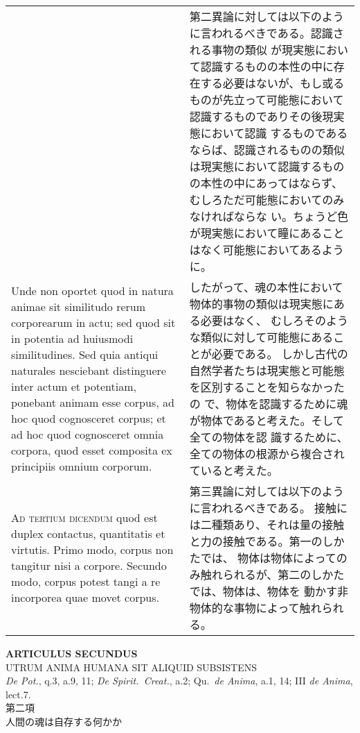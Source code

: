 \documentclass[paper=a4paper,fontsize=10pt,jafontsize=9pt,titlepage]{jlreq}
\begin{document}
\begin{longtable}{p{21em}p{21em}}
&

第二異論に対しては以下のように言われるべきである。認識される事物の類似
が現実態において認識するものの本性の中に存在する必要はないが、もし或る
ものが先立って可能態において認識するものでありその後現実態において認識
するものであるならば、認識されるものの類似は現実態において認識するもの
の本性の中にあってはならず、むしろただ可能態においてのみなければならな
い。ちょうど色が現実態において瞳にあることはなく可能態においてあるよう
に。

\\

Unde non oportet quod in natura animae sit similitudo rerum
corporearum in actu; sed quod sit in potentia ad huiusmodi
similitudines. Sed quia antiqui naturales nesciebant distinguere inter
actum et potentiam, ponebant animam esse corpus, ad hoc quod
cognosceret corpus; et ad hoc quod cognosceret omnia corpora, quod
esset composita ex principiis omnium corporum.


&

したがって、魂の本性において物体的事物の類似は現実態にある必要はなく、
 むしろそのような類似に対して可能態にあることが必要である。
しかし古代の自然学者たちは現実態と可能態を区別することを知らなかったの
 で、物体を認識するために魂が物体であると考えた。そして全ての物体を認
 識するために、全ての物体の根源から複合されていると考えた。

\\



{\scshape Ad tertium dicendum} quod est duplex contactus, quantitatis et
 virtutis. Primo modo, corpus non tangitur nisi a corpore. Secundo
 modo, corpus potest tangi a re incorporea quae movet corpus.


&

第三異論に対しては以下のように言われるべきである。
接触には二種類あり、それは量の接触と力の接触である。第一のしかたでは、
 物体は物体によってのみ触れられるが、第二のしかたでは、物体は、物体を
 動かす非物体的な事物によって触れられる。



\\




\end{longtable}
\newpage

\begin{center}
{\Large {\bfseries ARTICULUS SECUNDUS}}\\
{\large UTRUM ANIMA HUMANA SIT ALIQUID SUBSISTENS}\\
{\footnotesize {\itshape De Pot.}, q.3, a.9, 11; {\itshape De
 Spirit.~Creat.}, a.2; Qu.~{\itshape de Anima}, a.1, 14; III {\itshape
 de Anima}, lect.7.}\\
{\Large 第二項\\人間の魂は自存する何かか}
\end{center}
\end{document}
